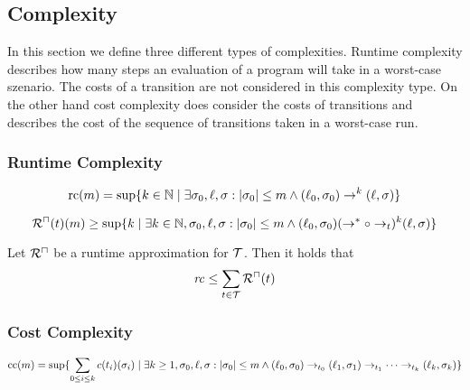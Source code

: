 \subsection{Complexity}

In this section we define three different types of complexities.
Runtime complexity describes how many steps an evaluation of a program will take in a worst-case szenario.
The costs of a transition are not considered in this complexity type.
On the other hand cost complexity does consider the costs of transitions and describes the cost of the sequence of transitions taken in a worst-case run.

\subsubsection{Runtime Complexity}

\begin{definition}
  \[ \text{rc}(m) = \sup \lbrace  k \in \mathbb{N} \mid \exists \sigma_0, \ell, \sigma: \left|\sigma_0\right| \leq m \wedge (\ell_0, \sigma_0) \rightarrow^k (\ell, \sigma)  \rbrace \]
\end{definition}

\begin{definition}
  \[ {\mathcal{R}^\sqcap}(t)(m) \geq \sup \lbrace  k \mid \exists k \in \mathbb{N}, \sigma_0, \ell, \sigma: \left|\sigma_0\right| \leq m \wedge (\ell_0, \sigma_0) (\rightarrow^* \circ \rightarrow_t)^k (\ell, \sigma)  \rbrace \]
\end{definition}

\begin{theorem}
	Let ${\mathcal{R}^\sqcap}$ be a runtime approximation for $\mathcal{T}$.
	Then it holds that 
	\[ \mathit{rc} \leq \sum_{t \in \mathcal{T}}{\mathcal{R}^\sqcap}(t) \]
\end{theorem}

\subsubsection{Cost Complexity}

\begin{definition}
\[ \text{cc}(m) = \sup \lbrace  \sum_{0 \leq i \leq k} c(t_i)(\sigma_i) \mid \exists k \geq 1, \sigma_0, \ell, \sigma: \left|\sigma_0\right| \leq m \wedge
  (\ell_0, \sigma_0) \rightarrow_{t_0} (\ell_1, \sigma_1) \rightarrow_{t_1} \dots \rightarrow_{t_k} (\ell_k, \sigma_k)  \rbrace \]
\end{definition}

